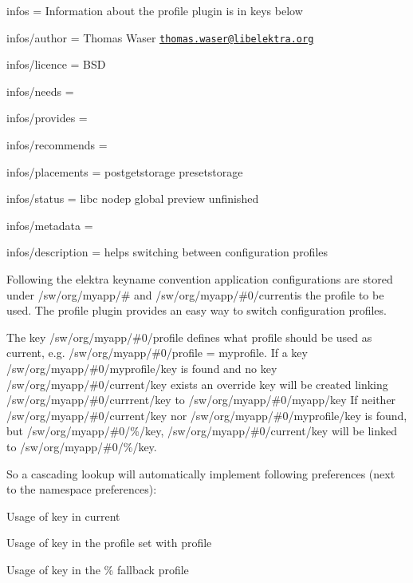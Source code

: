 
\begin{DoxyItemize}
\item infos = Information about the profile plugin is in keys below
\item infos/author = Thomas Waser \href{mailto:thomas.waser@libelektra.org}{\tt thomas.\+waser@libelektra.\+org}
\item infos/licence = B\+SD
\item infos/needs =
\item infos/provides =
\item infos/recommends =
\item infos/placements = postgetstorage presetstorage
\item infos/status = libc nodep global preview unfinished
\item infos/metadata =
\item infos/description = helps switching between configuration profiles
\end{DoxyItemize}

Following the elektra keyname convention application configurations are stored under {\ttfamily /sw/org/myapp/\#} and {\ttfamily /sw/org/myapp/\#0/current}is the profile to be used. The {\ttfamily profile} plugin provides an easy way to switch configuration profiles.

The key {\ttfamily /sw/org/myapp/\#0/profile} defines what profile should be used as {\ttfamily current}, e.\+g. {\ttfamily /sw/org/myapp/\#0/profile = myprofile}. If a key {\ttfamily /sw/org/myapp/\#0/myprofile/key} is found and no key {\ttfamily /sw/org/myapp/\#0/current/key} exists an override key will be created linking {\ttfamily /sw/org/myapp/\#0/currrent/key} to {\ttfamily /sw/org/myapp/\#0/myapp/key} If neither {\ttfamily /sw/org/myapp/\#0/current/key} nor {\ttfamily /sw/org/myapp/\#0/myprofile/key} is found, but {\ttfamily /sw/org/myapp/\#0/\%/key}, {\ttfamily /sw/org/myapp/\#0/current/key} will be linked to {\ttfamily /sw/org/myapp/\#0/\%/key}.

So a cascading lookup will automatically implement following preferences (next to the namespace preferences)\+:


\begin{DoxyEnumerate}
\item Usage of key in {\ttfamily current}
\item Usage of key in the profile set with {\ttfamily profile}
\item Usage of key in the {\ttfamily \%} fallback profile
\end{DoxyEnumerate}

